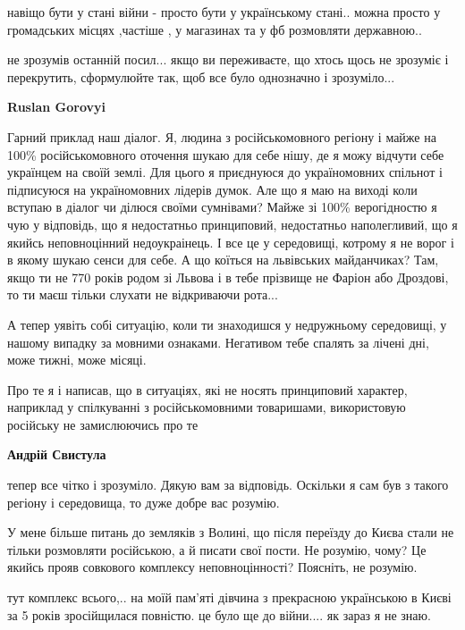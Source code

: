 \begin{itemize}
\begin{itemize}
навіщо бути у стані війни - просто бути у українському стані.. можна просто у
громадських місцях ,частіше , у магазинах та у фб розмовляти державною..



не зрозумів останній посил... якщо ви переживаєте, що хтось щось не зрозуміє і
перекрутить, сформулюйте так, щоб все було однозначно і зрозуміло...


\textbf{Ruslan Gorovyi}

Гарний приклад наш діалог. Я, людина з російськомовного регіону і майже на 100\%
російськомовного оточення шукаю для себе нішу, де я можу відчути себе українцем
на своїй землі. Для цього я приєднуюся до україномовних спільнот і підписуюся
на україномовних лідерів думок. Але що я маю на виході коли вступаю в діалог чи
ділюся своїми сумнівами? Майже зі 100\% верогідностю я чую у відповідь, що я
недостатньо принциповий, недостатньо наполегливий, що я якийсь неповноцінний
недоукраінець. І все це у середовищі, котрому я не ворог і в якому шукаю сенси
для себе. А що коїться на львівських майданчиках? Там, якщо ти не 770 років
родом зі Львова і в тебе прізвище не Фаріон або Дроздові, то ти маєш тільки
слухати не відкриваючи рота...

А тепер уявіть собі ситуацію, коли ти знаходишся у недружньому середовищі, у
нашому випадку за мовними ознаками. Негативом тебе спалять за лічені дні, може
тижні, може місяці.

Про те я і написав, що в ситуаціях, які не носять принциповий характер,
наприклад у спілкуванні з російськомовними товаришами, використовую російську
не замислюючись про те

\textbf{Андрій Свистула} 

тепер все чітко і зрозуміло. Дякую вам за відповідь. Оскільки я сам був з
такого регіону і середовища, то дуже добре вас розумію.

\end{itemize} %


У мене більше питань до земляків з Волині, що після переїзду до Києва стали не
тільки розмовляти російською, а й писати свої пости. Не розумію, чому? Це
якийсь прояв совкового комплексу неповноцінності? Поясніть, не розумію.

\begin{itemize} %

тут комплекс всього,.. на моїй пам'яті дівчина з прекрасною українською в Києві
за 5 років зросійщилася повністю. це було ще до війни.... як зараз я не знаю.


\end{itemize}
\end{itemize}
